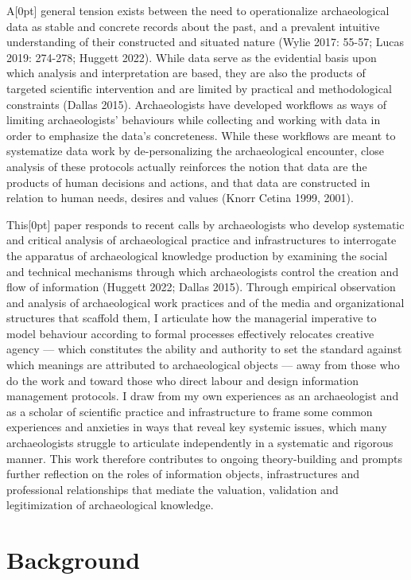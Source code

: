 \documentclass[
]{article}
\newcommand{\paragraphnumber}[1]{\marginnote{\color{lightgray}\tiny{#1}}[0pt]}
\begin{document}
A\paragraphnumber{[1]} general tension exists between the need to
operationalize archaeological data as stable and concrete records about
the past, and a prevalent intuitive understanding of their constructed
and situated nature (Wylie 2017: 55-57; Lucas 2019: 274-278; Huggett
2022). While data serve as the evidential basis upon which analysis and
interpretation are based, they are also the products of targeted
scientific intervention and are limited by practical and methodological
constraints (Dallas 2015). Archaeologists have developed workflows as
ways of limiting archaeologists' behaviours while collecting and working
with data in order to emphasize the data's concreteness. While these
workflows are meant to systematize data work by de-personalizing the
archaeological encounter, close analysis of these protocols actually
reinforces the notion that data are the products of human decisions and
actions, and that data are constructed in relation to human needs,
desires and values (Knorr Cetina 1999, 2001).

This\paragraphnumber{[2]} paper responds to recent calls by
archaeologists who develop systematic and critical analysis of
archaeological practice and infrastructures to interrogate the apparatus
of archaeological knowledge production by examining the social and
technical mechanisms through which archaeologists control the creation
and flow of information (Huggett 2022; Dallas 2015). Through empirical
observation and analysis of archaeological work practices and of the
media and organizational structures that scaffold them, I articulate how
the managerial imperative to model behaviour according to formal
processes effectively relocates creative agency --- which constitutes
the ability and authority to set the standard against which meanings are
attributed to archaeological objects --- away from those who do the work
and toward those who direct labour and design information management
protocols. I draw from my own experiences as an archaeologist and as a
scholar of scientific practice and infrastructure to frame some common
experiences and anxieties in ways that reveal key systemic issues, which
many archaeologists struggle to articulate independently in a systematic
and rigorous manner. This work therefore contributes to ongoing
theory-building and prompts further reflection on the roles of
information objects, infrastructures and professional relationships that
mediate the valuation, validation and legitimization of archaeological
knowledge.

\section{Background}\label{background}
\end{document}
